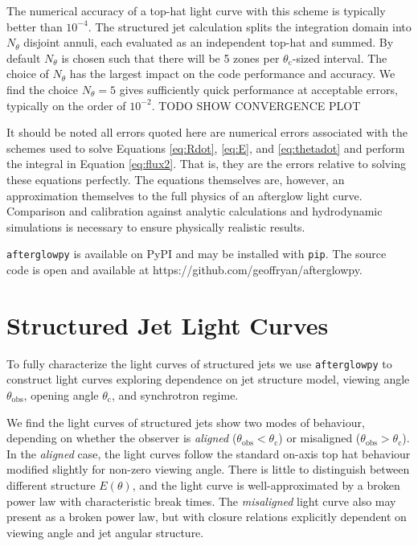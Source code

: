 \documentclass[twocolumn]{aastex62}
\newcommand{\afterglowpy}{{\tt afterglowpy}}
\newcommand{\thobs}{\ensuremath{\theta_{\mathrm{obs}}}}
\newcommand{\thC}{\ensuremath{\theta_{\mathrm{c}}}}
\begin{document}
The numerical accuracy of a top-hat light curve with this scheme is typically better than $10^{-4}$.  The structured jet calculation splits the integration domain into $N_\theta$ disjoint annuli, each evaluated as an independent top-hat and summed.  By default $N_\theta$ is chosen such that there will be 5 zones per $\thC$-sized interval.   The choice of $N_\theta$ has the largest impact on the code performance and accuracy.  We find the choice $N_\theta = 5$ gives sufficiently quick performance at acceptable errors, typically on the order of $10^{-2}$.  TODO SHOW CONVERGENCE PLOT

It should be noted all errors quoted here are numerical errors associated with the schemes used to solve Equations \ref{eq:Rdot}, \ref{eq:E}, and \ref{eq:thetadot} and perform the integral in Equation \ref{eq:flux2}.  That is, they are the errors relative to solving these equations perfectly.  The equations themselves are, however, an approximation themselves to the full physics of an afterglow light curve.  Comparison and calibration against analytic calculations and hydrodynamic simulations is necessary to ensure physically realistic results.  

\afterglowpy{} is available on PyPI and may be installed with {\tt pip}.  The source code is open and available at https://github.com/geoffryan/afterglowpy.

\section{Structured Jet Light Curves}\label{sec:structuredJets}

To fully characterize the light curves of structured jets we use \afterglowpy{} to construct light curves exploring dependence on jet structure model, viewing angle $\thobs$, opening angle $\thC$, and synchrotron regime.  

We find the light curves of structured jets show two modes of behaviour, depending on whether the observer is \emph{aligned} ($\thobs < \thC$) or misaligned ($\thobs > \thC$). In the \emph{aligned} case, the light curves follow the standard on-axis top hat behaviour modified slightly for non-zero viewing angle.  There is little to distinguish between different structure $E(\theta)$, and the light curve is well-approximated by a broken power law with characteristic break times.  The \emph{misaligned} light curve also may present as a broken power law, but with closure relations explicitly dependent on viewing angle and jet angular structure.  
\end{document}
